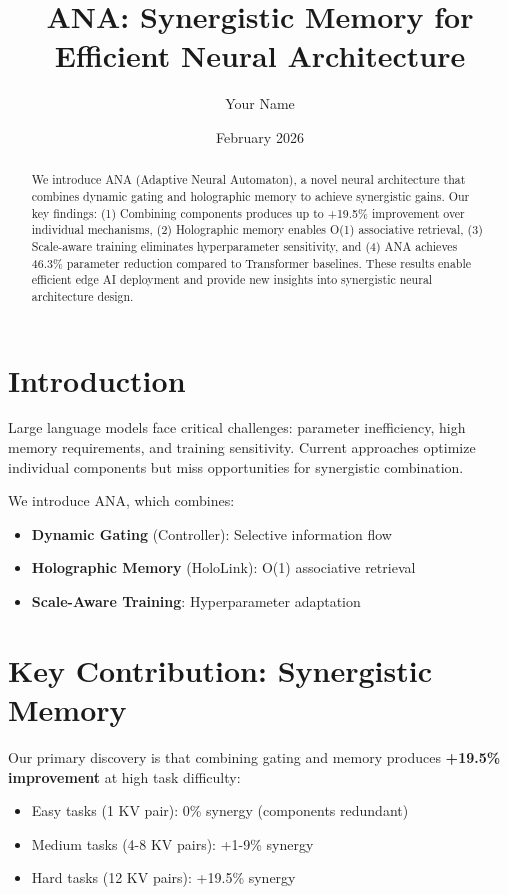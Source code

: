 \documentclass[10pt]{article}
\title{\textbf{ANA: Synergistic Memory for Efficient Neural Architecture}}
\author{Your Name}
\date{February 2026}
\begin{document}
\maketitle

\begin{abstract}
We introduce ANA (Adaptive Neural Automaton), a novel neural architecture that combines dynamic gating and holographic memory to achieve synergistic gains. Our key findings: (1) Combining components produces up to +19.5\% improvement over individual mechanisms, (2) Holographic memory enables O(1) associative retrieval, (3) Scale-aware training eliminates hyperparameter sensitivity, and (4) ANA achieves 46.3\% parameter reduction compared to Transformer baselines. These results enable efficient edge AI deployment and provide new insights into synergistic neural architecture design.
\end{abstract}

\section{Introduction}

Large language models face critical challenges: parameter inefficiency, high memory requirements, and training sensitivity. Current approaches optimize individual components but miss opportunities for synergistic combination.

We introduce ANA, which combines:
\begin{itemize}
    \item \textbf{Dynamic Gating} (Controller): Selective information flow
    \item \textbf{Holographic Memory} (HoloLink): O(1) associative retrieval
    \item \textbf{Scale-Aware Training}: Hyperparameter adaptation
\end{itemize}

\section{Key Contribution: Synergistic Memory}

Our primary discovery is that combining gating and memory produces \textbf{+19.5\% improvement} at high task difficulty:

\begin{itemize}
    \item Easy tasks (1 KV pair): 0\% synergy (components redundant)
    \item Medium tasks (4-8 KV pairs): +1-9\% synergy
    \item Hard tasks (12 KV pairs): +19.5\% synergy
\end{itemize}
\end{document}
